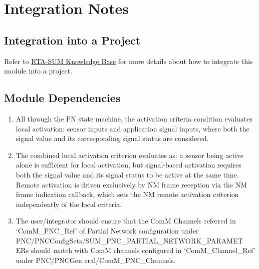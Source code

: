 \chapter{Integration Notes}

\section{Integration into a Project}
\ifnum {}
\fi

Refer to \href {https://rtahotline.etas.com/confluence/display/RH/RTA-SUM}{RTA-SUM Knowledge Base} for more details about 
how to integrate this module into a project. 

\section{Module Dependencies}
\begin{enumerate}
\item All through the PN state machine, the activation criteria condition evaluates local activation: sensor inputs and application signal inputs, where both the signal value and its corresponding signal status are considered.
\item The combined local activation criterion evaluates as: a sensor being active alone is sufficient for local activation, but signal-based activation requires both the signal value and its signal status to be active at the same time. Remote activation is driven exclusively by NM frame reception via the NM frame indication callback, which sets the NM remote activation criterion independently of the local criteria.
\item The user/integrator should ensure that the ComM Channels referred in ‘ComM\_PNC\_Ref’ of Partial Network configuration under {\color{blue} PNC/PNCConfigSets/SUM\_PNC\_PARTIAL\_NETWORK\_PARAMET ERs} should match with ComM channels configured in ‘ComM\_Channel\_Ref’ under {\color{blue} PNC/PNCGen eral/ComM\_PNC\_Channels}.  
\end{enumerate}


